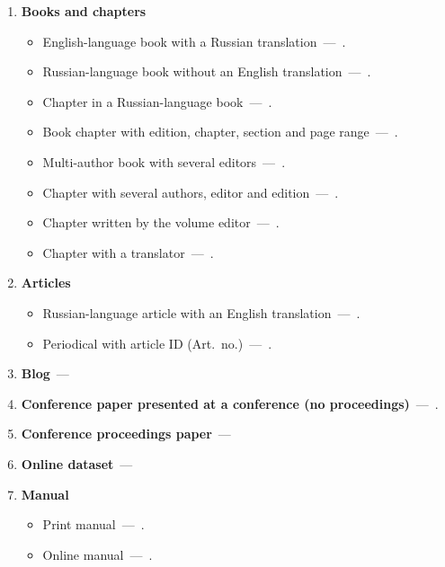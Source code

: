 \documentclass[eqsecnum,authorsinfo]{kioj6}
\begin{document}
    \begin{enumerate}
        \item \textbf{Books and chapters}
        \begin{itemize}[nosep]
            \item English-language book with a Russian translation~---~\cite{Hairer}.
            \item Russian-language book without an English translation~---~\cite{Gubanov}.
            \item Chapter in a Russian-language book~---~\cite{layexpl7}.
            \item Book chapter with edition, chapter, section and page range~---~\cite{ogura}.
            \item Multi-author book with several editors~---~\cite{HastieTibshiraniFriedman2009}.
            \item Chapter with several authors, editor and edition~---~\cite{Alberts2014CellCycle}.
            \item Chapter written by the volume editor~---~\cite{Gowers2008LanguageGrammar}.
            \item Chapter with a translator~---~\cite{Aleksandrov1963GeneralView}.
        \end{itemize}

        \item \textbf{Articles}
        \begin{itemize}[nosep]
            \item Russian-language article with an English translation~---~\cite{Matveenko}.
            \item Periodical with article ID (Art.~no.)~---~\cite{Abbott2016GW150914}.
        \end{itemize}

        \item \textbf{Blog}~---~\cite{Dmitry2024Python}

        \item \textbf{Conference paper presented at a conference (no proceedings)}~---~\cite{Caratelli}.

        \item \textbf{Conference proceedings paper}~---~\cite{BYSIS2022}

        \item \textbf{Online dataset}~---~\cite{pavlov_2025_14923680}

        \item \textbf{Manual}
        \begin{itemize}[nosep]
            \item Print manual~---~\cite{TransmissionSystems}.
            \item Online manual~---~\cite{BreimannRF}.
        \end{itemize}


\end{enumerate}
\end{document}
